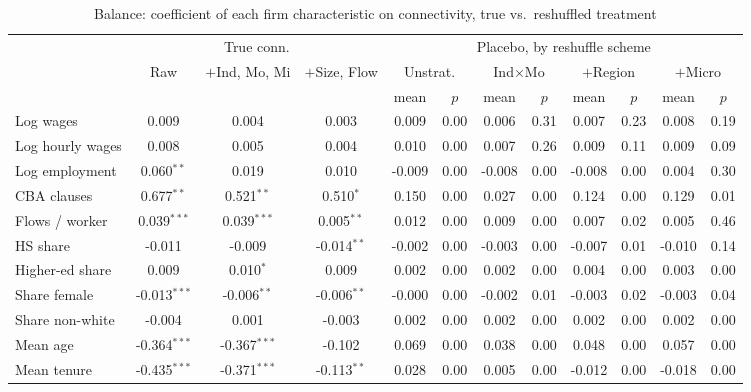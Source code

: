 \begin{table}[htbp]\centering
\caption{Balance: coefficient of each firm characteristic on connectivity, true vs.\ reshuffled treatment}
\label{tab:balance_permute}
{\setlength{\tabcolsep}{3pt}\scriptsize
\begin{tabular}{l ccc cccccccc}
\toprule
 & \multicolumn{3}{c}{True conn.} & \multicolumn{8}{c}{Placebo, by reshuffle scheme} \\
\cmidrule(lr){2-4}\cmidrule(lr){5-12}
 & Raw & \shortstack{$+$Ind,\\Mo, Mi} & \shortstack{$+$Size,\\Flow} & \multicolumn{2}{c}{Unstrat.} & \multicolumn{2}{c}{Ind$\times$Mo} & \multicolumn{2}{c}{$+$Region} & \multicolumn{2}{c}{$+$Micro} \\
 & & & & mean & $p$ & mean & $p$ & mean & $p$ & mean & $p$ \\
\midrule
Log wages & 0.009 & 0.004 & 0.003 & 0.009 & 0.00 & 0.006 & 0.31 & 0.007 & 0.23 & 0.008 & 0.19 \\
Log hourly wages & 0.008 & 0.005 & 0.004 & 0.010 & 0.00 & 0.007 & 0.26 & 0.009 & 0.11 & 0.009 & 0.09 \\
Log employment & 0.060$^{**}$ & 0.019 & 0.010 & -0.009 & 0.00 & -0.008 & 0.00 & -0.008 & 0.00 & 0.004 & 0.30 \\
CBA clauses & 0.677$^{**}$ & 0.521$^{**}$ & 0.510$^{*}$ & 0.150 & 0.00 & 0.027 & 0.00 & 0.124 & 0.00 & 0.129 & 0.01 \\
Flows / worker & 0.039$^{***}$ & 0.039$^{***}$ & 0.005$^{**}$ & 0.012 & 0.00 & 0.009 & 0.00 & 0.007 & 0.02 & 0.005 & 0.46 \\
HS share & -0.011 & -0.009 & -0.014$^{**}$ & -0.002 & 0.00 & -0.003 & 0.00 & -0.007 & 0.01 & -0.010 & 0.14 \\
Higher-ed share & 0.009 & 0.010$^{*}$ & 0.009 & 0.002 & 0.00 & 0.002 & 0.00 & 0.004 & 0.00 & 0.003 & 0.00 \\
Share female & -0.013$^{***}$ & -0.006$^{**}$ & -0.006$^{**}$ & -0.000 & 0.00 & -0.002 & 0.01 & -0.003 & 0.02 & -0.003 & 0.04 \\
Share non-white & -0.004 & 0.001 & -0.003 & 0.002 & 0.00 & 0.002 & 0.00 & 0.002 & 0.00 & 0.002 & 0.00 \\
Mean age & -0.364$^{***}$ & -0.367$^{***}$ & -0.102 & 0.069 & 0.00 & 0.038 & 0.00 & 0.048 & 0.00 & 0.057 & 0.00 \\
Mean tenure & -0.435$^{***}$ & -0.371$^{***}$ & -0.113$^{**}$ & 0.028 & 0.00 & 0.005 & 0.00 & -0.012 & 0.00 & -0.018 & 0.00 \\

\end{tabular}}
\end{table}
